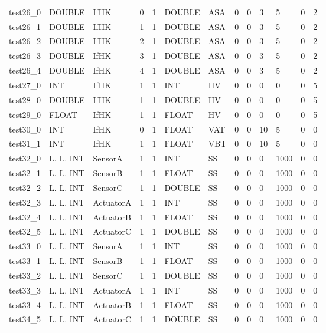 \begin{longtable}{|l|l|l|p{0.5cm}|p{0.5cm}|l|p{0.5cm}|p{0.5cm}|p{0.5cm}|l|l|p{0.5cm}|l|}
test26\_0 & DOUBLE & IfHK & 0 & 1 & DOUBLE & ASA & 0 & 0 & 3 & 5 & 0 & 2 \\
test26\_1 & DOUBLE & IfHK & 1 & 1 & DOUBLE & ASA & 0 & 0 & 3 & 5 & 0 & 2 \\
test26\_2 & DOUBLE & IfHK & 2 & 1 & DOUBLE & ASA & 0 & 0 & 3 & 5 & 0 & 2 \\
test26\_3 & DOUBLE & IfHK & 3 & 1 & DOUBLE & ASA & 0 & 0 & 3 & 5 & 0 & 2 \\
test26\_4 & DOUBLE & IfHK & 4 & 1 & DOUBLE & ASA & 0 & 0 & 3 & 5 & 0 & 2 \\
test27\_0 & INT & IfHK & 1 & 1 & INT & HV & 0 & 0 & 0 & 0 & 0 & 5 \\
test28\_0 & DOUBLE & IfHK & 1 & 1 & DOUBLE & HV & 0 & 0 & 0 & 0 & 0 & 5 \\
test29\_0 & FLOAT & IfHK & 1 & 1 & FLOAT & HV & 0 & 0 & 0 & 0 & 0 & 5 \\
test30\_0 & INT & IfHK & 0 & 1 & FLOAT & VAT & 0 & 0 & 10 & 5 & 0 & 0 \\
test31\_1 & INT & IfHK & 1 & 1 & FLOAT & VBT & 0 & 0 & 10 & 5 & 0 & 0 \\
test32\_0 & L. L. INT & SensorA & 1 & 1 & INT & SS & 0 & 0 & 0 & 1000 & 0 & 0 \\
test32\_1 & L. L. INT & SensorB & 1 & 1 & FLOAT & SS & 0 & 0 & 0 & 1000 & 0 & 0 \\
test32\_2 & L. L. INT & SensorC & 1 & 1 & DOUBLE & SS & 0 & 0 & 0 & 1000 & 0 & 0 \\
test32\_3 & L. L. INT & ActuatorA & 1 & 1 & INT & SS & 0 & 0 & 0 & 1000 & 0 & 0 \\
test32\_4 & L. L. INT & ActuatorB & 1 & 1 & FLOAT & SS & 0 & 0 & 0 & 1000 & 0 & 0 \\
test32\_5 & L. L. INT & ActuatorC & 1 & 1 & DOUBLE & SS & 0 & 0 & 0 & 1000 & 0 & 0 \\
test33\_0 & L. L. INT & SensorA & 1 & 1 & INT & SS & 0 & 0 & 0 & 1000 & 0 & 0 \\
test33\_1 & L. L. INT & SensorB & 1 & 1 & FLOAT & SS & 0 & 0 & 0 & 1000 & 0 & 0 \\
test33\_2 & L. L. INT & SensorC & 1 & 1 & DOUBLE & SS & 0 & 0 & 0 & 1000 & 0 & 0 \\
test33\_3 & L. L. INT & ActuatorA & 1 & 1 & INT & SS & 0 & 0 & 0 & 1000 & 0 & 0 \\
test33\_4 & L. L. INT & ActuatorB & 1 & 1 & FLOAT & SS & 0 & 0 & 0 & 1000 & 0 & 0 \\
test34\_5 & L. L. INT & ActuatorC & 1 & 1 & DOUBLE & SS & 0 & 0 & 0 & 1000 & 0 & 0 \\

\end{longtable}
